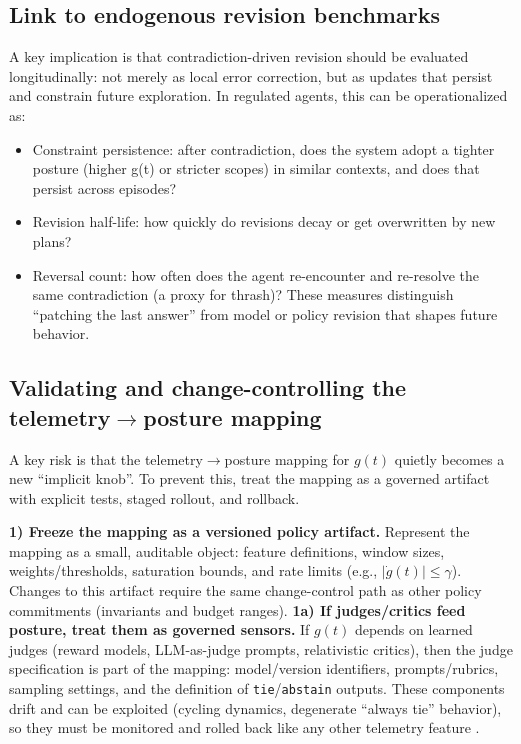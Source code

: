 \documentclass[11pt]{article}
\begin{document}
\subsection{Link to endogenous revision benchmarks}
A key implication is that contradiction-driven revision should be evaluated longitudinally: not
merely as local error correction, but as updates that persist and constrain future exploration. In
regulated agents, this can be operationalized as:
\begin{itemize}
\item 
Constraint persistence: after contradiction, does the system adopt a tighter posture (higher
g(t) or stricter scopes) in similar contexts, and does that persist across episodes?
\item 
Revision half-life: how quickly do revisions decay or get overwritten by new plans?
\item 
Reversal count: how often does the agent re-encounter and re-resolve the same contradiction (a
proxy for thrash)?
These measures distinguish “patching the last answer” from model or policy revision that shapes
future behavior.
\end{itemize}
\subsection{Validating and change-controlling the telemetry\texorpdfstring{$\rightarrow$}{->}posture mapping}
A key risk is that the telemetry$\rightarrow$posture mapping for $g(t)$ quietly becomes a new ``implicit knob''.
To prevent this, treat the mapping as a governed artifact with explicit tests, staged rollout, and rollback.

\textbf{1) Freeze the mapping as a versioned policy artifact.}
Represent the mapping as a small, auditable object: feature definitions, window sizes, weights/thresholds, saturation bounds,
and rate limits (e.g., $\lvert \dot{g}(t)\rvert \le \gamma$). Changes to this artifact require the same change-control path as other
policy commitments (invariants and budget ranges).
\textbf{1a) If judges/critics feed posture, treat them as governed sensors.}
If $g(t)$ depends on learned judges (reward models, LLM-as-judge prompts, relativistic critics), then the judge specification is part of the mapping:
model/version identifiers, prompts/rubrics, sampling settings, and the definition of \texttt{tie}/\texttt{abstain} outputs. These components drift and can be exploited (cycling dynamics, degenerate ``always tie'' behavior), so they must be monitored and rolled back like any other telemetry feature \citep{cai2025escapingverifier}.
\end{document}
